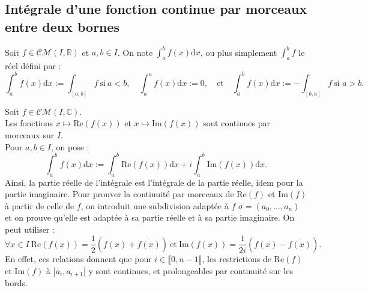 \documentclass[11pt]{article}
\newcommand*{\C}{\mathbb{C}}
\newcommand*{\R}{\mathbb{R}}
\newcommand*{\CM}{\mathcal{CM}}
\newcommand{\0}{\varnothing}
\newcommand*{\s}{\sigma}
\newcommand*{\lb}{\llbracket}
\newcommand*{\rb}{\rrbracket}
\newcommand{\dx}{\textrm{d}x}
\renewcommand*{\Re}{\textrm{Re}}
\renewcommand{\Im}{\textrm{Im}}
\begin{document}
\subsection{Intégrale d'une fonction continue par morceaux entre deux bornes}
\begin{defi}{}{}
    Soit $f\in\CM(I,\R)$ et $a,b\in I$. On note $\int_a^bf(x)\dx$, ou plus simplement $\int_a^bf$ le réel défini par :
    \begin{equation*}
        \int_a^bf(x)\dx:=\int_{[a,b]}f ~ \text{si} ~ a<b, \quad \int_a^af(x)\dx:=0,\quad \text{et}\quad\int_a^bf(x)\dx:=-\int_{[b,a]}f~\text{si } a>b.
    \end{equation*}
\end{defi}

\begin{prop}{}{}
    Soit $f\in\CM(I,\C)$.\\
    Les fonctions $x\mapsto\Re(f(x))$ et $x\mapsto\Im(f(x))$ sont continues par morceaux sur $I$.\\
    Pour $a,b\in I$, on pose :
    \begin{equation*}
        \int_a^bf(x)\dx:=\int_a^b\Re(f(x))\dx+i\int_a^b\Im(f(x))\dx.
    \end{equation*}
    Ainsi, la partie réelle de l'intégrale est l'intégrale de la partie réelle, idem pour la partie imaginaire.
    \tcblower
    Pour prouver la continuité par morceaux de $\Re(f)$ et $\Im(f)$ à partir de celle de $f$, on introduit une subdivision adaptée à $f$ $\s=(a_0,...,a_n)$ et on prouve qu'elle est adaptée à sa partie réelle et à sa partie imaginaire. On peut utiliser :
    \begin{equation*}
        \forall x\in I ~ \Re(f(x)) = \frac{1}{2}(f(x)+\overline{f(x)}) ~ \text{et} ~ \Im(f(x))=\frac{1}{2i}(f(x)-\overline{f(x)}).
    \end{equation*}
    En effet, ces relations donnent que pour $i\in\lb0,n-1\rb$, les restrictions de $\Re(f)$ et $\Im(f)$ à $]a_i,a_{i+1}[$ y sont continues, et prolongeables par continuité sur les bords.
\end{prop}

\pagebreak
\end{document}
